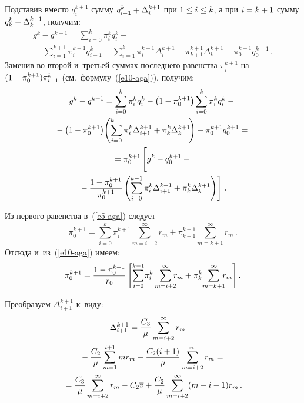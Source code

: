 \begin{multicols}{2}
{  Подставив вместо $q_i^{k+1}$ сумму $q_{i-1}^k\hm+ \Delta_i^{k+1}$ при 
$1\hm\leq i\hm\leq k$, а при $i\hm= k\hm+1$  сумму $q_k^k\hm+ 
\Delta_k^{k+1}$, получим:
  \begin{multline*}
  g^k-g^{k+1} =\sum\limits^k_{i=0}\pi_i^k q_i^k -{}\\
  {}- \sum\limits_{i=1}^{k+1} \pi_i^{k+1} q^k_{i-1} - \sum\limits^k_{i=1} 
\pi_i^{k+1} \Delta_i^{k+1} - \pi_{k+1}^{k+1} \Delta_k^{k+1} -\pi_0^{k+1} 
q_0^{k+1}\,.
  \end{multline*}
    Заменив во 
второй и~третьей суммах последнего равенства $\pi_i^{k+1}$ на 
$(1\hm-\pi_0^{k+1})\pi^k_{i-1}$ (см.\ формулу~(\ref{e10-aga})),  
получим:
  \begin{multline}
  g^k-g^{k+1} =\sum\limits^k_{i=0} \pi_i^k q_i^k -\left( 1-\pi_0^{k+1}\right) 
\sum\limits^k_{i=0} \pi_i^k q_i^k-{}\\
  {}-
   \left( 1-\pi_0^{k+1}\right)\! \left( \sum\limits^{k-1}_{i=0} \pi_i^k \Delta_{i+1}^{k+1} +\pi_k^k 
\Delta_k^{k+1}\!\right) -\pi_0^{k+1} q_0^{k+1}={}\\
   {}=
  \pi_0^{k+1} \left[ 
  \vphantom{\fr{1-\pi_0^{k+1}}{\pi_0^{k+1}} \sum\limits^{k-1}_{i=0}}
  g^k-q_0^{k+1} -{}\right.\\
  \left.{}-\fr{1-\pi_0^{k+1}}{\pi_0^{k+1}}\left( 
\sum\limits^{k-1}_{i=0} \pi_i^k \Delta_{i+1}^{k+1} +\pi_k^k 
\Delta_k^{k+1}
\right)\right]\,.
  \label{p6-aga}
  \end{multline}
  
  Из первого равенства в~(\ref{e5-aga}) следует 
  $$
  \pi_0^{k+1} =\sum\limits^k_{i=0} \pi_i^{k+1} \sum\limits^\infty_{m=i+2} r_m 
+\pi_{k+1}^{k+1} \sum\limits^\infty_{m=k+1} r_m\,.
  $$
    Отсюда и~из~(\ref{e10-aga}) имеем:
  \begin{equation}
  \pi_0^{k+1} =\fr{1-\pi_0^{k+1}}{r_0}\left[  \sum\limits_{i=0}^{k-1} \!\pi_i^k 
\sum\limits^\infty_{m=i+2}\!\!\! r_m+\pi_k^k \!\sum\limits^\infty_{m=k+1} \!\!\!r_m\right].
  \label{p7-aga}
  \end{equation}
  
  Преобразуем $\Delta_{i+1}^{k+1}$ к~виду:
  \begin{multline*}
  \Delta_{i+1}^{k+1} =\displaystyle\frac{\displaystyle C_3\mathstrut}{\displaystyle \mu\mathstrut} \sum\limits^\infty_{m=i+2} r_m -{}\\
  {}-
\displaystyle\frac{\displaystyle C_2\mathstrut}{\displaystyle \mu\mathstrut} \sum\limits_{m=1}^{i+1} mr_m -\displaystyle\frac{\displaystyle C_2(i+1)\mathstrut}{\displaystyle \mu\mathstrut} 
\sum\limits^\infty_{m=i+2} r_m={}\\
 {}= \displaystyle\frac{\displaystyle C_3\mathstrut}{\displaystyle \mu\mathstrut} \sum\limits^\infty_{m=i+2} r_m -C_2\overline{v} 
+\displaystyle\frac{\displaystyle C_2\mathstrut}{\displaystyle \mu\mathstrut} \sum\limits^\infty_{m=i+2} (m-i-1) r_m\,.
  \end{multline*}
 
}
\end{multicols}
